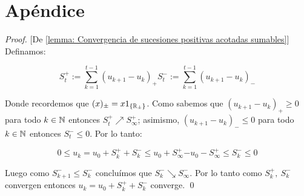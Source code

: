 \chapter{Ap\'endice}\label{ch: apendice}

\begin{proof}{[De \ref{lemma: Convergencia de sucesiones positivas acotadas sumables}]}
	Definamos:
	
	\begin{subequations}
		\begin{equation}
			S^+_t := \sum\limits_{k=1}^{t-1} {\left(u_{k+1} - u_k\right)_+}
		\end{equation}
		\begin{equation}
			S^-_t := \sum\limits_{k=1}^{t-1} {\left(u_{k+1} - u_k\right)_-}
		\end{equation}
	\end{subequations}
	
	Donde recordemos que $(x)_{\pm} = x1_{\left\lbrace{\mathbb{R}}_{\pm}\right\rbrace}$. Como sabemos que $ {\left(u_{k+1} - u_k\right)_+} \geq 0$ para todo $k \in {\mathbb{N}}$ entonces $S_t^+ \nearrow S_{\infty}^+$; asimismo,  $ {\left(u_{k+1} - u_k\right)_-} \leq 0$ para todo $k \in {\mathbb{N}}$ entonces $S_t^- \leq 0$. Por lo tanto:
	
	\begin{subequations}
		\begin{equation}
			0 \leq u_k = u_0 + S_k^+ + S_k^- \leq u_0 + S_{\infty}^+
		\end{equation}
		\begin{equation}
			-u_0 - S_{\infty}^+ \leq S_k^- \leq 0
		\end{equation}
	\end{subequations}
	
	Luego como $S_{k+1}^- \leq S_k^-$ conclu\'imos que $S_{k}^- \searrow S_{\infty}^-$. Por lo tanto como $S_k^+, \ S_k^-$ convergen entonces $u_k = u_0 + S_k^+ + S_k^- $ converge. \qed
	
\end{proof}

